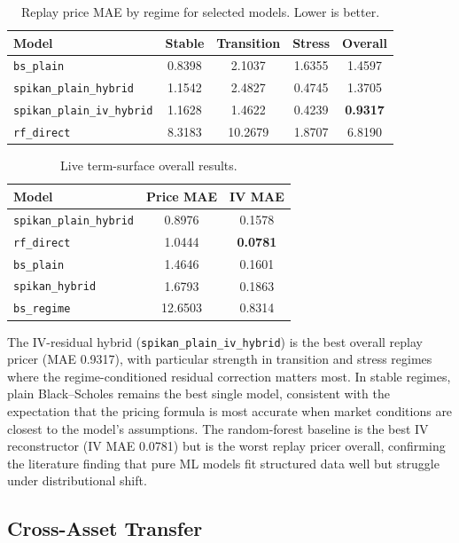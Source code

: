 \documentclass[11pt,a4paper]{article}
\begin{document}
\begin{table}[h]
\centering
\caption{Replay price MAE by regime for selected models. Lower is better.}
\begin{tabular}{@{}lcccc@{}}
\toprule
Model & Stable & Transition & Stress & Overall \\ \midrule
\texttt{bs\_plain} & 0.8398 & 2.1037 & 1.6355 & 1.4597 \\
\texttt{spikan\_plain\_hybrid} & 1.1542 & 2.4827 & 0.4745 & 1.3705 \\
\texttt{spikan\_plain\_iv\_hybrid} & 1.1628 & 1.4622 & 0.4239 & \textbf{0.9317} \\
\texttt{rf\_direct} & 8.3183 & 10.2679 & 1.8707 & 6.8190 \\
\bottomrule
\end{tabular}
\label{tab:replay_pricing}
\end{table}

\begin{table}[h]
\centering
\caption{Live term-surface overall results.}
\begin{tabular}{@{}lcc@{}}
\toprule
Model & Price MAE & IV MAE \\ \midrule
\texttt{spikan\_plain\_hybrid} & 0.8976 & 0.1578 \\
\texttt{rf\_direct} & 1.0444 & \textbf{0.0781} \\
\texttt{bs\_plain} & 1.4646 & 0.1601 \\
\texttt{spikan\_hybrid} & 1.6793 & 0.1863 \\
\texttt{bs\_regime} & 12.6503 & 0.8314 \\ \bottomrule
\end{tabular}
\label{tab:live_pricing}
\end{table}

The IV-residual hybrid (\texttt{spikan\_plain\_iv\_hybrid}) is the best overall replay pricer (MAE 0.9317), with particular strength in transition and stress regimes where the regime-conditioned residual correction matters most. In stable regimes, plain Black--Scholes remains the best single model, consistent with the expectation that the pricing formula is most accurate when market conditions are closest to the model's assumptions. The random-forest baseline is the best IV reconstructor (IV MAE 0.0781) but is the worst replay pricer overall, confirming the literature finding that pure ML models fit structured data well but struggle under distributional shift.

\subsection{Cross-Asset Transfer}
\end{document}
